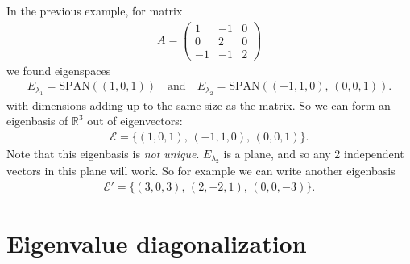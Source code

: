 


\noindent In the previous example, for matrix
\begin{align*}
A =
\begin{pmatrix}
  1 & -1 &  0 \\
  0 &  2 &  0 \\
 -1 & -1 &  2
\end{pmatrix}
\end{align*}
we found eigenspaces 
\begin{align*}
E_{\lambda_1} = \text{SPAN}((1,0,1)) \quad \text{and} \quad
E_{\lambda_2} = \text{SPAN}((-1,1,0), \, (0,0,1)).
\end{align*}
with dimensions adding up to the same size as the matrix. So we can form an eigenbasis of $\mathbb{R}^3$ out of eigenvectors:
\begin{align*}
\mathcal{E} = \{ (1,0,1), \, (-1,1,0), \, (0,0,1) \}.
\end{align*}
Note that this eigenbasis is \textit{not unique}. $E_{\lambda_2}$ is a plane, and so any 2 independent vectors in this plane will work. So for example we can write another eigenbasis
\begin{align*}
\mathcal{E}' = \{ (3,0,3), \, (2,-2,1), \, (0,0,-3) \}.
\end{align*}

\section{Eigenvalue diagonalization}


